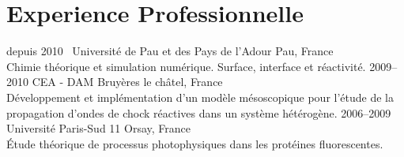 \documentclass[french]{cv-style}      %
\begin{document}


\section{Experience Professionnelle}

\begin{entrylist}
\entry
  {depuis 2010~}
  {Université de Pau et des Pays de l'Adour}
  {Pau, France}
  {\\
   Chimie théorique et simulation numérique.
   Surface, interface et réactivité.}
\entry
  {2009--2010}
  {CEA - DAM}
  {Bruyères le châtel, France}
  {
  \\
  Développement et implémentation d'un modèle mésoscopique pour l'étude de la propagation
  d'ondes de chock réactives dans un système hétérogène.
  }
\entry
  {2006--2009}
  {Université Paris-Sud 11}
  {Orsay, France}
  {
  \\
  Étude théorique de processus photophysiques dans les protéines fluorescentes.
  }
\end{entrylist}
\end{document}
